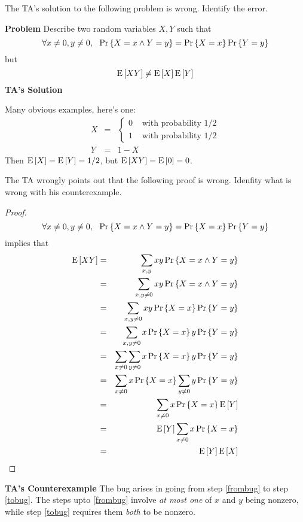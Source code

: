 \documentclass[11pt,twoside]{article}
\begin{document}
\begin{problem}
\begin{problemparts}
\problempart
The TA's solution to the following problem is wrong.  Identify the error.

\textbf{Problem}
Describe two random variables $X, Y$ such that
$$
\forall x\neq 0, y\neq 0,~~\prob{X=x\wedge Y=y}=\prob{X=x}\prob{Y=y}
$$
but
$$
\expect{XY}\neq\expect{X}\expect{Y}
$$
\textbf{TA's Solution}

Many obvious examples, here's one:
\begin{eqnarray*}
X&=&\left\{
\begin{array}{ll}
0&\textrm{  with probability }1/2\\
1&\textrm{  with probability }1/2
\end{array}\right.\\
Y&=&1-X
\end{eqnarray*}
Then $\expect{X}=\expect{Y}=1/2$, but $\expect{XY}=\expect{0}=0$.


\problempart The TA wrongly points out that the following proof is
wrong.  Idenfity what is wrong with his counterexample.

\begin{proof}
$$
\forall x\neq 0, y\neq 0,~~\prob{X=x\wedge Y=y}=\prob{X=x}\prob{Y=y}
$$
implies that
\begin{eqnarray}
\expect{XY}&=&\sum_{x, y} xy\prob{X=x \wedge Y=y}\\
&=&\sum_{x, y\neq 0} xy\prob{X=x \wedge Y=y}\\
&=&\sum_{x, y\neq 0} xy\prob{X=x}\prob{Y=y}\\
&=&\sum_{x, y\neq 0} x\prob{X=x}y\prob{Y=y}\label{frombug}\\
&=&\sum_{x\neq 0}\sum_{y\neq 0}x\prob{X=x}y\prob{Y=y}\\
&=&\sum_{x\neq 0} x\prob{X=x} \sum_{y\neq 0} y\prob{Y=y}\label{tobug} \\
&=&\sum_{x\neq 0} x\prob{X=x} \expect{Y} \\
&=&\expect{Y}\sum_{x\neq 0} x\prob{X=x}  \\
&=&\expect{Y}\expect{X}
\end{eqnarray}
\end{proof}

\textbf{TA's Counterexample}
The bug arises in going from step \ref{frombug} to step \ref{tobug}.
The steps upto \ref{frombug} involve \emph{at most one} of $x$ and $y$
being nonzero, while step \ref{tobug} requires them \emph{both} to be
nonzero. 


\end{problemparts}
\end{problem}
\end{document}
